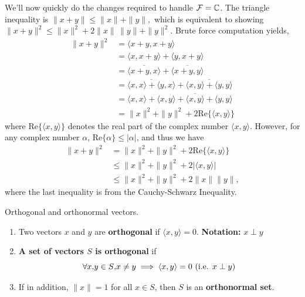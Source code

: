     We'll now quickly do the changes required to handle $\mathcal{F} = \mathbb C$. The triangle inequality is
$
	\| x + y \| \leqslant \| x \| + \| y \|,
$ which is equivalent to showing $
	\| x + y \|^2 \leqslant \| x \|^2 + 2 \| x \| \, \| y \| + \| y \|^2.
$
Brute force computation yields,
\begin{align*}
	\| x + y \|^2 &= \langle x+y,x+y \rangle   \\
	&= \langle x,x+y \rangle   + \langle y,x+y \rangle  \\
&= \overline{\langle x+y,x \rangle  } + \overline{\langle x+y,y \rangle  }\\
&= \overline{\langle x,x \rangle   + \langle y,x \rangle  } + \overline{\langle x,y \rangle   + \langle y,y \rangle  }\\
	&= \langle x,x \rangle   +  \langle x,y \rangle   +   \overline{\langle x,y \rangle  }+ \langle y,y \rangle   \\
	&= \| x \|^2 + \| y \|^2 + 2 \mathrm{Re}\{ \langle x,y \rangle  \}
\end{align*}
where $\mathrm{Re}\{ \langle x,y \rangle  \}$ denotes the real part of the complex number $\langle x,y \rangle  $. However, for any complex number $\alpha$, $\mathrm{Re}\{\alpha \} \le | \alpha|$, and thus we have
\begin{align*}
\| x + y \|^2 &= \| x \|^2 + \| y \|^2 + 2 \mathrm{Re}\{ \langle x,y \rangle  \} \\
	&\leqslant \| x \|^2 + \| y \|^2 +
		 2 |\langle x,y \rangle  | \\
	&\leqslant \| x \|^2 + \| y \|^2
		+ 2 \|x \| \|y\|,
\end{align*}
where the last inequality is from the Cauchy-Schwarz Inequality.
    
    
    \Qed
    
    \vspace*{.2cm}
    

\begin{definition}
    Orthogonal and orthonormal vectors.
\begin{enumerate}
        \renewcommand{\labelenumi}{(\alph{enumi})}
        \setlength{\itemsep}{.1cm}
    \item Two vectors $x$ and $y$ are \textbf{orthogonal} if $ \langle x,y \rangle =0$. \textbf{Notation:} $x \perp y$
    \item \textbf{A set of vectors $S$ is orthogonal} if $$\forall x \text{,} y \in S \text{,} x \neq y \implies \langle x,y \rangle =0 \mbox{ (i.e. $ x \perp y$)}$$
    \item If in addition, $\|x\|=1$ for all $x \in S$, then $S$ is an \textbf{orthonormal set}.
\end{enumerate}

\end{definition}


